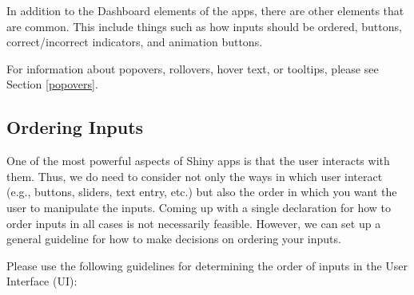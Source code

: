 \documentclass[
]{book}
\begin{document}
In addition to the Dashboard elements of the apps, there are other elements that are common. This include things such as how inputs should be ordered, buttons, correct/incorrect indicators, and animation buttons.

For information about popovers, rollovers, hover text, or tooltips, please see Section \ref{popovers}.

\hypertarget{ordering-inputs}{%
\subsection{Ordering Inputs}\label{ordering-inputs}}

One of the most powerful aspects of Shiny apps is that the user interacts with them. Thus, we do need to consider not only the ways in which user interact (e.g., buttons, sliders, text entry, etc.) but also the order in which you want the user to manipulate the inputs. Coming up with a single declaration for how to order inputs in all cases is not necessarily feasible. However, we can set up a general guideline for how to make decisions on ordering your inputs.

Please use the following guidelines for determining the order of inputs in the User Interface (UI):
\end{document}
